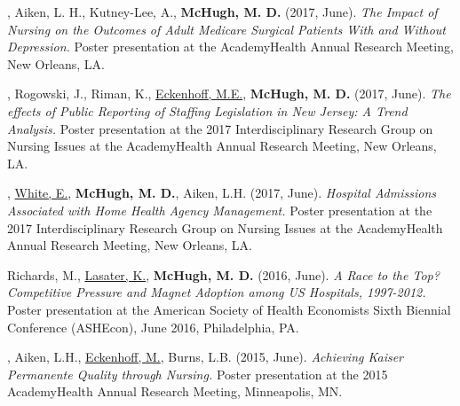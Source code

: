 \documentclass[10pt,]{article}
\begin{document}
{{{{{{{{{{{{{{{\begin{hangparas}{.25in}{1}
, Aiken, L. H., Kutney-Lee, A., {\textbf {McHugh, M. D.}} (2017, June). {\textit {The Impact of Nursing on the Outcomes of Adult Medicare Surgical Patients With and Without Depression.}} Poster presentation at the AcademyHealth Annual Research Meeting, New Orleans, LA.

\end{hangparas}



\begin{hangparas}{.25in}{1}

, Rogowski, J., Riman, K., {\underline {Eckenhoff, M.E.}}, {\textbf {McHugh, M. D.}} (2017, June). {\textit {The effects of Public Reporting of Staffing Legislation in New Jersey: A Trend Analysis.}} Poster presentation at the 2017 Interdisciplinary Research Group on Nursing Issues at the AcademyHealth Annual Research Meeting, New Orleans, LA.

\end{hangparas}



\begin{hangparas}{.25in}{1}

, {\underline {White, E.}}, {\textbf {McHugh, M. D.}}, Aiken, L.H. (2017, June). {\textit {Hospital Admissions Associated with Home Health Agency Management.}} Poster presentation at the 2017 Interdisciplinary Research Group on Nursing Issues at the AcademyHealth Annual Research Meeting, New Orleans, LA.

\end{hangparas}



\begin{hangparas}{.25in}{1}

\*Richards, M., {\underline {Lasater, K.}}, {\textbf {McHugh, M. D.}} (2016, June). {\textit {A Race to the Top? Competitive Pressure and Magnet Adoption among US Hospitals, 1997-2012.}} Poster presentation at the American Society of Health Economists Sixth Biennial Conference (ASHEcon), June 2016, Philadelphia, PA.

\end{hangparas}



\begin{hangparas}{.25in}{1}

, Aiken, L.H., {\underline {Eckenhoff, M.}}, Burns, L.B. (2015, June). {\textit {Achieving Kaiser Permanente Quality through Nursing.}} Poster presentation at the 2015 AcademyHealth Annual Research Meeting, Minneapolis, MN.


\end{hangparas}}}}}}}}}}}}}}}}
\end{document}
